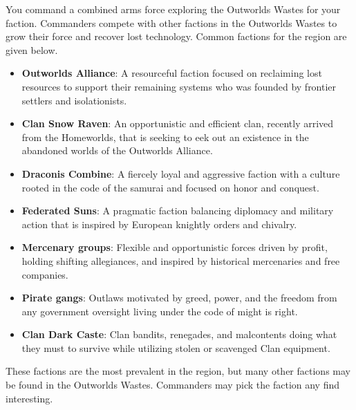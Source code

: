 You command a combined arms force exploring the Outworlds Wastes for your faction.
Commanders compete with other factions in the Outworlds Wastes to grow their force and recover lost technology.
Common factions for the region are given below.

\begin{itemize}

\item {\bfseries Outworlds Alliance}: A resourceful faction focused on reclaiming lost resources to support their remaining systems who was founded by frontier settlers and isolationists.

\item {\bfseries Clan Snow Raven}: An opportunistic and efficient clan, recently arrived from the Homeworlds, that is seeking to eek out an existence in the abandoned worlds of the Outworlds Alliance. 

\item {\bfseries Draconis Combine}: A fiercely loyal and aggressive faction with a culture rooted in the code of the samurai and focused on honor and conquest.

\item {\bfseries Federated Suns}: A pragmatic faction balancing diplomacy and military action that is inspired by European knightly orders and chivalry.

\item {\bfseries Mercenary groups}: Flexible and opportunistic forces driven by profit, holding shifting allegiances, and inspired by historical mercenaries and free companies.

\item {\bfseries Pirate gangs}: Outlaws motivated by greed, power, and the freedom from any government oversight living under the code of might is right. 

\item {\bfseries Clan Dark Caste}: Clan bandits, renegades, and malcontents doing what they must to survive while utilizing stolen or scavenged Clan equipment.

\end{itemize}

These factions are the most prevalent in the region, but many other factions may be found in the Outworlds Wastes.
Commanders may pick the faction any find interesting.
